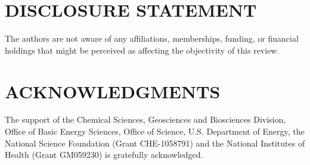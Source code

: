 \documentclass{ar-1col}
\begin{document}
\section*{DISCLOSURE STATEMENT}
The authors are not aware of any affiliations, memberships, funding, or financial holdings that might be perceived as 
affecting the objectivity of this review.


\section*{ACKNOWLEDGMENTS}
The support of the Chemical Sciences, Geosciences and Biosciences
Division, Office of Basic Energy Sciences, Office of Science,
U.S. Department of Energy, the National Science Foundation (Grant CHE-1058791) 
and the National Institutes of Health (Grant GM059230)
is gratefully acknowledged.
\end{document}
